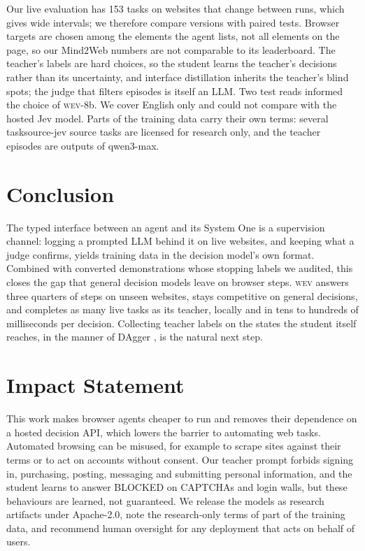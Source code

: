 \documentclass{article}
\newcommand{\wev}{\textsc{wev}\xspace}
\begin{document}
Our live evaluation has 153 tasks on websites that change between runs, which gives wide intervals; we therefore
compare versions with paired tests. Browser targets are chosen among the elements the agent lists, not all elements on
the page, so our Mind2Web numbers are not comparable to its leaderboard. The teacher's labels are hard choices, so the
student learns the teacher's decisions rather than its uncertainty, and interface distillation inherits the teacher's
blind spots; the judge that filters episodes is itself an LLM. Two test reads informed the choice of \wev-8b. We cover
English only and could not compare with the hosted Jev model. Parts of the training data carry their own terms: several
tasksource-jev source tasks are licensed for research only, and the teacher episodes are outputs of qwen3-max.

\section{Conclusion}
\label{sec:conclusion}

The typed interface between an agent and its System One is a supervision channel: logging a prompted LLM behind it on
live websites, and keeping what a judge confirms, yields training data in the decision model's own format. Combined
with converted demonstrations whose stopping labels we audited, this closes the gap that general decision models leave
on browser steps. \wev answers three quarters of steps on unseen websites, stays competitive on general decisions, and
completes as many live tasks as its teacher, locally and in tens to hundreds of milliseconds per decision. Collecting
teacher labels on the states the student itself reaches, in the manner of DAgger \citep{ross2011dagger}, is the
natural next step.

\section*{Impact Statement}

This work makes browser agents cheaper to run and removes their dependence on a hosted decision API, which lowers the
barrier to automating web tasks. Automated browsing can be misused, for example to scrape sites against their terms or
to act on accounts without consent. Our teacher prompt forbids signing in, purchasing, posting, messaging and submitting
personal information, and the student learns to answer BLOCKED on CAPTCHAs and login walls, but these behaviours are
learned, not guaranteed. We release the models as research artifacts under Apache-2.0, note the research-only terms of
part of the training data, and recommend human oversight for any deployment that acts on behalf of users.
\end{document}
